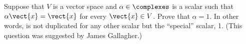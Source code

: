 Suppose that $V$ is a vector space and $\alpha\in\complexes$ is a scalar such that $\alpha\vect{x}=\vect{x}$ for every $\vect{x}\in V$.  Prove that $\alpha = 1$.  In other words,  is not duplicated for any other scalar but the ``special'' scalar, 1.  (This question was suggested by James Gallagher.)
